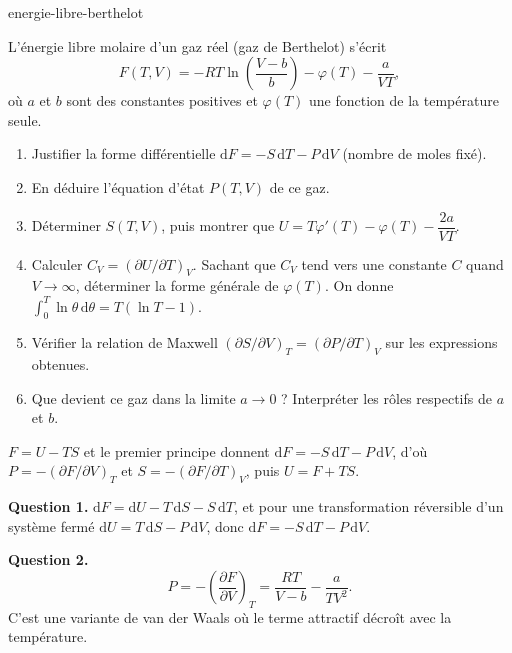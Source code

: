\begin{exo}{energie-libre-berthelot}

L'énergie libre molaire d'un gaz réel (gaz de Berthelot) s'écrit
\[
F(T,V) = -RT\ln\!\left(\frac{V-b}{b}\right) - \varphi(T) - \frac{a}{VT},
\]
où $a$ et $b$ sont des constantes positives et $\varphi(T)$ une fonction de la température seule.

\begin{enumerate}
\item Justifier la forme différentielle $\mathrm{d}F = -S\,\mathrm{d}T - P\,\mathrm{d}V$ (nombre de moles fixé).
\item En déduire l'équation d'état $P(T,V)$ de ce gaz.
\item Déterminer $S(T,V)$, puis montrer que $U = T\varphi'(T) - \varphi(T) - \dfrac{2a}{VT}$.
\item Calculer $C_V = \left(\partial U/\partial T\right)_V$. Sachant que $C_V$ tend vers une constante $C$ quand $V \to \infty$, déterminer la forme générale de $\varphi(T)$. On donne $\int_0^T\ln\theta\,\mathrm{d}\theta = T(\ln T - 1)$.
\item Vérifier la relation de Maxwell $\left(\partial S/\partial V\right)_T = \left(\partial P/\partial T\right)_V$ sur les expressions obtenues.
\item Que devient ce gaz dans la limite $a \to 0$ ? Interpréter les rôles respectifs de $a$ et $b$.
\end{enumerate}

\begin{indication}
$F = U - TS$ et le premier principe donnent $\mathrm{d}F = -S\,\mathrm{d}T - P\,\mathrm{d}V$, d'où $P = -\left(\partial F/\partial V\right)_T$ et $S = -\left(\partial F/\partial T\right)_V$, puis $U = F + TS$.
\end{indication}

\begin{solution}
\textbf{Question 1.} $\mathrm{d}F = \mathrm{d}U - T\,\mathrm{d}S - S\,\mathrm{d}T$, et pour une transformation réversible d'un système fermé $\mathrm{d}U = T\,\mathrm{d}S - P\,\mathrm{d}V$, donc $\mathrm{d}F = -S\,\mathrm{d}T - P\,\mathrm{d}V$.

\textbf{Question 2.}
\[
P = -\left(\frac{\partial F}{\partial V}\right)_T = \frac{RT}{V-b} - \frac{a}{TV^2}.
\]
C'est une variante de van der Waals où le terme attractif décroît avec la température.


\end{solution}
\end{exo}
